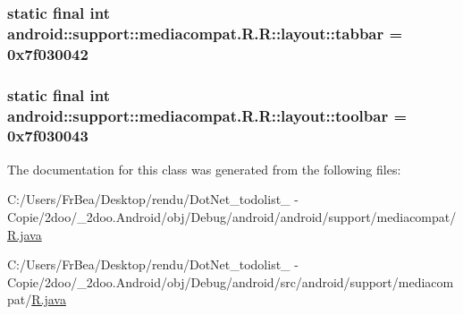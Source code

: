 \hypertarget{classandroid_1_1support_1_1mediacompat_1_1_r_1_1layout_5e658ca4824c5ed9ed8f9b3cf1aed3c1}{
\subsubsection[{tabbar}]{\setlength{\rightskip}{0pt plus 5cm}static final int android::support::mediacompat.R.R::layout::tabbar = 0x7f030042}}
\label{classandroid_1_1support_1_1mediacompat_1_1_r_1_1layout_5e658ca4824c5ed9ed8f9b3cf1aed3c1}


\hypertarget{classandroid_1_1support_1_1mediacompat_1_1_r_1_1layout_5e0731282ab841316f349be8c862d6bf}{
\subsubsection[{toolbar}]{\setlength{\rightskip}{0pt plus 5cm}static final int android::support::mediacompat.R.R::layout::toolbar = 0x7f030043}}
\label{classandroid_1_1support_1_1mediacompat_1_1_r_1_1layout_5e0731282ab841316f349be8c862d6bf}




The documentation for this class was generated from the following files:\begin{CompactItemize}
\item 
C:/Users/FrBea/Desktop/rendu/DotNet\_\-todolist\_ - Copie/2doo/\_\-2doo.Android/obj/Debug/android/android/support/mediacompat/\hyperlink{android_2support_2mediacompat_2_r_8java}{R.java}\item 
C:/Users/FrBea/Desktop/rendu/DotNet\_\-todolist\_ - Copie/2doo/\_\-2doo.Android/obj/Debug/android/src/android/support/mediacompat/\hyperlink{src_2android_2support_2mediacompat_2_r_8java}{R.java}\end{CompactItemize}
